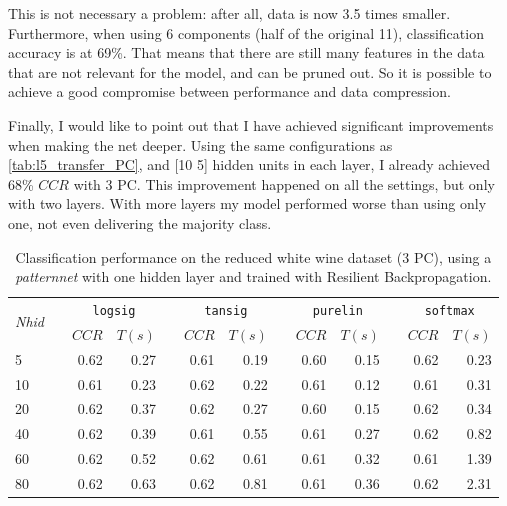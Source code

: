 \documentclass[a4paper, 10pt]{article}
\begin{document}
  This is not necessary a problem: after all, data is now 3.5 times smaller. 
  Furthermore, when using 6 components (half of the original 11), classification
  accuracy is at 69\%. That means that there are still many features in the data
  that are not relevant for the model, and can be pruned out. So it is possible
  to achieve a good compromise between performance and data compression.

  Finally, I would like to point out that I have achieved significant improvements
  when making the net deeper. Using the same configurations as 
  \autoref{tab:l5_transfer_PC}, and [10 5] hidden units in each layer, I already
  achieved 68\% $CCR$ with 3 PC. This improvement happened on all the settings, 
  but only with two layers. With more layers my model performed worse than using only
  one, not even delivering the majority class.

  \begin{table}[p]
    \centering
    \begin{tabular}{@{}lrrrrrrrrrrrr@{}}
      \toprule
      \multirow{2}{*}{\emph{Nhid}}&& \multicolumn{2}{c}{\texttt{logsig}} &&
        \multicolumn{2}{c}{\texttt{tansig}} && \multicolumn{2}{c}{\texttt{purelin}} 
        && \multicolumn{2}{c}{\texttt{softmax}} \\
      && $CCR$ & $T(s)$ && $CCR$ & $T(s)$ && $CCR$ & $T(s)$ && $CCR$ & $T(s)$ \\
      \midrule
       5 && 0.62 & 0.27 && 0.61 & 0.19 && 0.60 & 0.15 && 0.62 & 0.23 \\
      10 && 0.61 & 0.23 && 0.62 & 0.22 && 0.61 & 0.12 && 0.61 & 0.31 \\
      20 && 0.62 & 0.37 && 0.62 & 0.27 && 0.60 & 0.15 && 0.62 & 0.34 \\
      40 && 0.62 & 0.39 && 0.61 & 0.55 && 0.61 & 0.27 && 0.62 & 0.82 \\
      60 && 0.62 & 0.52 && 0.62 & 0.61 && 0.61 & 0.32 && 0.61 & 1.39 \\
      80 && 0.62 & 0.63 && 0.62 & 0.81 && 0.61 & 0.36 && 0.62 & 2.31 \\
    \bottomrule
  \end{tabular}
  \caption{Classification performance on the reduced white wine dataset (3 PC),
    using a \emph{patternnet} with one hidden layer and trained with 
Resilient Backpropagation.}
  \label{tab:l5_transfer_PC}
  \end{table}
\end{document}
